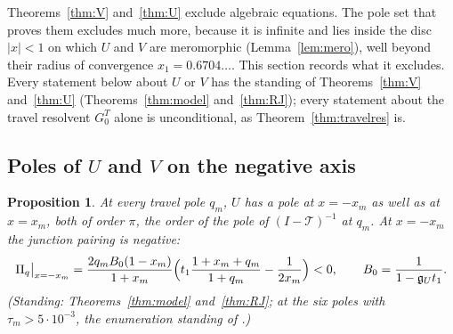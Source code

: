 \documentclass[11pt]{article}
\theoremstyle{plain}
\newtheorem{proposition}[theorem]{Proposition}
\theoremstyle{definition}
\theoremstyle{remark}
\theoremstyle{plain}\newtheorem*{maintheorem}{Main Theorem}
\begin{document}
Theorems~\ref{thm:V} and~\ref{thm:U} exclude algebraic equations. The pole set that proves them
excludes much more, because it is infinite and lies inside the disc $|x|<1$ on which $U$ and $V$ are
meromorphic (Lemma~\ref{lem:mero}), well beyond their radius of convergence $x_1=0.6704\ldots$. This
section records what it excludes. Every statement below about $U$ or $V$ has the standing of
Theorems~\ref{thm:V} and~\ref{thm:U} (Theorems~\ref{thm:model} and~\ref{thm:RJ}); every statement
about the travel resolvent $G^T_0$ alone is unconditional, as Theorem~\ref{thm:travelres} is.

\subsection{Poles of \texorpdfstring{$U$}{U} and \texorpdfstring{$V$}{V} on the negative axis}

\begin{proposition}\label{prop:minusx}
At every travel pole $q_m$, $U$ has a pole at $x=-x_m$ as well as at $x=x_m$, both of order
$\pi$, the order of the pole of $(I-\mathcal T)^{-1}$ at $q_m$. At $x=-x_m$ the junction pairing is
negative:
\[
   \Pi_q\big|_{x=-x_m}=\frac{2q_mB_0(1-x_m)}{1+x_m}\Bigl(t_1\frac{1+x_m+q_m}{1+q_m}
   -\frac1{2x_m}\Bigr)<0,\qquad B_0=\frac1{1-\mathfrak g_Ut_1}.
\]
\textup{(}Standing: Theorems~\ref{thm:model} and~\ref{thm:RJ}; at the six poles with
$\tau_m>5\cdot10^{-3}$, the enumeration standing of {\cite[Theorem ``the amplitude estimate $(\star)$'', \textup{thm:star}]{Bonfioli2026bB}}.\textup{)}
\end{proposition}
\end{document}
